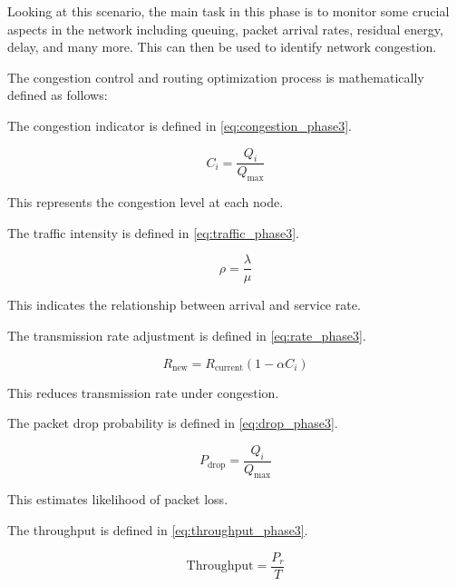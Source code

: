 \documentclass[a4paper,fleqn]{cas-dc}
\numberwithin{equation}{section}
\begin{document}
Looking at this scenario, the main task in this phase is to monitor some crucial aspects in the network including queuing, packet arrival rates, residual energy, delay, and many more. This can then be used to identify network congestion.

\vspace{6pt}

\vspace{6pt}


The congestion control and routing optimization process is mathematically defined as follows:


\vspace{6pt}

The congestion indicator is defined in \ref{eq:congestion_phase3}.

\begin{equation}
C_i = \frac{Q_i}{Q_{\max}}
\label{eq:congestion_phase3}
\end{equation}

This represents the congestion level at each node.

The traffic intensity is defined in \ref{eq:traffic_phase3}.

\begin{equation}
\rho = \frac{\lambda}{\mu}
\label{eq:traffic_phase3}
\end{equation}

This indicates the relationship between arrival and service rate.

The transmission rate adjustment is defined in \ref{eq:rate_phase3}.

\begin{equation}
R_{\text{new}} = R_{\text{current}} (1 - \alpha C_i)
\label{eq:rate_phase3}
\end{equation}

This reduces transmission rate under congestion.

The packet drop probability is defined in \ref{eq:drop_phase3}.

\begin{equation}
P_{\text{drop}} = \frac{Q_i}{Q_{\max}}
\label{eq:drop_phase3}
\end{equation}

This estimates likelihood of packet loss.

The throughput is defined in \ref{eq:throughput_phase3}.

\begin{equation}
\text{Throughput} = \frac{P_r}{T}
\label{eq:throughput_phase3}
\end{equation}
\end{document}
